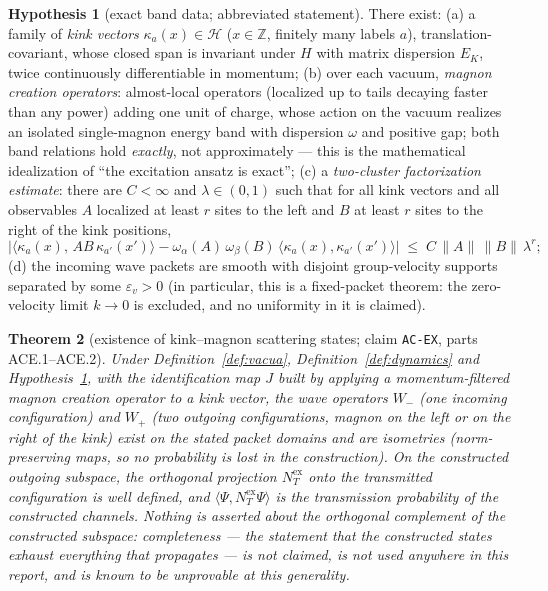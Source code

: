 \documentclass[11pt]{article}
\newtheorem{theorem}{Theorem}[section]
\theoremstyle{definition}
\newtheorem{hypothesis}[theorem]{Hypothesis}
\theoremstyle{remark}
\newcommand{\Hs}{\mathcal{H}}
\newcommand{\Z}{\mathbb{Z}}
\begin{document}
\begin{hypothesis}[exact band data; abbreviated statement]\label{hyp:band}
There exist: (a) a family of \emph{kink vectors} $\kappa_a(x)\in\Hs$
($x\in\Z$, finitely many labels $a$), translation-covariant, whose closed
span is invariant under $H$ with matrix dispersion $E_K$, twice continuously
differentiable in momentum; (b) over each vacuum, \emph{magnon creation
operators}: almost-local operators (localized up to tails decaying faster
than any power) adding one unit of charge, whose action on the vacuum
realizes an isolated single-magnon energy band with dispersion $\omega$ and
positive gap; both band relations hold \emph{exactly}, not approximately ---
this is the mathematical idealization of ``the excitation ansatz is exact'';
(c) a \emph{two-cluster factorization estimate}: there are $C<\infty$ and
$\lambda\in(0,1)$ such that for all kink vectors and all observables $A$
localized at least $r$ sites to the left and $B$ at least $r$ sites to the
right of the kink positions,
\[
\bigl|\langle\kappa_a(x),\,AB\,\kappa_{a'}(x')\rangle
-\omega_\alpha(A)\,\omega_\beta(B)\,\langle\kappa_a(x),\kappa_{a'}(x')\rangle\bigr|
\;\le\;C\,\|A\|\,\|B\|\,\lambda^{r};
\]
(d) the incoming wave packets are smooth with disjoint group-velocity
supports separated by some $\varepsilon_v>0$ (in particular, this is a
fixed-packet theorem: the zero-velocity limit $k\to0$ is excluded, and no
uniformity in it is claimed).
\end{hypothesis}

\begin{theorem}[existence of kink--magnon scattering states; claim
\texttt{AC-EX}, parts ACE.1--ACE.2]\label{thm:acex}
Under Definition~\ref{def:vacua}, Definition~\ref{def:dynamics} and
Hypothesis~\ref{hyp:band}, with the identification map $J$ built by applying
a momentum-filtered magnon creation operator to a kink vector, the wave
operators $W_-$ (one incoming configuration) and $W_+$ (two outgoing
configurations, magnon on the left or on the right of the kink) exist on the
stated packet domains and are isometries (norm-preserving maps, so no
probability is lost in the construction).  On the \emph{constructed}
outgoing subspace, the orthogonal projection $N_T^{\mathrm{ex}}$ onto the
transmitted configuration is well defined, and
$\langle\Psi,N_T^{\mathrm{ex}}\Psi\rangle$ is the transmission probability of
the constructed channels.  Nothing is asserted about the orthogonal
complement of the constructed subspace: completeness --- the statement that
the constructed states exhaust everything that propagates --- is not claimed,
is not used anywhere in this report, and is known to be unprovable at this
generality.
\end{theorem}
\end{document}
